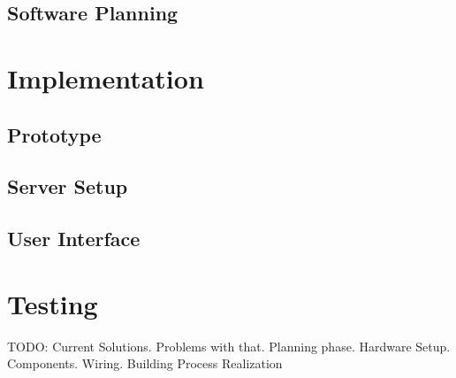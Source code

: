 \subsection{Software Planning}

\section{Implementation}


\subsection{Prototype}


\subsection{Server Setup}


\subsection{User Interface}


\section{Testing}

TODO: Current Solutions. Problems with that. Planning phase. Hardware Setup. Components. Wiring. Building Process
Realization
